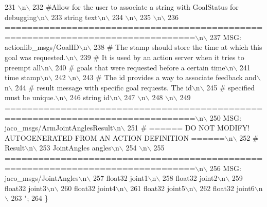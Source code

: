 \begin{DoxyCode}
231 \textcolor{stringliteral}{\(\backslash\)n\(\backslash\)}
232 \textcolor{stringliteral}{#Allow for the user to associate a string with GoalStatus for debugging\(\backslash\)n\(\backslash\)}
233 \textcolor{stringliteral}{string text\(\backslash\)n\(\backslash\)}
234 \textcolor{stringliteral}{\(\backslash\)n\(\backslash\)}
235 \textcolor{stringliteral}{\(\backslash\)n\(\backslash\)}
236 \textcolor{stringliteral}{================================================================================\(\backslash\)n\(\backslash\)}
237 \textcolor{stringliteral}{MSG: actionlib\_msgs/GoalID\(\backslash\)n\(\backslash\)}
238 \textcolor{stringliteral}{# The stamp should store the time at which this goal was requested.\(\backslash\)n\(\backslash\)}
239 \textcolor{stringliteral}{# It is used by an action server when it tries to preempt all\(\backslash\)n\(\backslash\)}
240 \textcolor{stringliteral}{# goals that were requested before a certain time\(\backslash\)n\(\backslash\)}
241 \textcolor{stringliteral}{time stamp\(\backslash\)n\(\backslash\)}
242 \textcolor{stringliteral}{\(\backslash\)n\(\backslash\)}
243 \textcolor{stringliteral}{# The id provides a way to associate feedback and\(\backslash\)n\(\backslash\)}
244 \textcolor{stringliteral}{# result message with specific goal requests. The id\(\backslash\)n\(\backslash\)}
245 \textcolor{stringliteral}{# specified must be unique.\(\backslash\)n\(\backslash\)}
246 \textcolor{stringliteral}{string id\(\backslash\)n\(\backslash\)}
247 \textcolor{stringliteral}{\(\backslash\)n\(\backslash\)}
248 \textcolor{stringliteral}{\(\backslash\)n\(\backslash\)}
249 \textcolor{stringliteral}{================================================================================\(\backslash\)n\(\backslash\)}
250 \textcolor{stringliteral}{MSG: jaco\_msgs/ArmJointAnglesResult\(\backslash\)n\(\backslash\)}
251 \textcolor{stringliteral}{# ====== DO NOT MODIFY! AUTOGENERATED FROM AN ACTION DEFINITION ======\(\backslash\)n\(\backslash\)}
252 \textcolor{stringliteral}{# Result\(\backslash\)n\(\backslash\)}
253 \textcolor{stringliteral}{JointAngles angles\(\backslash\)n\(\backslash\)}
254 \textcolor{stringliteral}{\(\backslash\)n\(\backslash\)}
255 \textcolor{stringliteral}{================================================================================\(\backslash\)n\(\backslash\)}
256 \textcolor{stringliteral}{MSG: jaco\_msgs/JointAngles\(\backslash\)n\(\backslash\)}
257 \textcolor{stringliteral}{float32 joint1\(\backslash\)n\(\backslash\)}
258 \textcolor{stringliteral}{float32 joint2\(\backslash\)n\(\backslash\)}
259 \textcolor{stringliteral}{float32 joint3\(\backslash\)n\(\backslash\)}
260 \textcolor{stringliteral}{float32 joint4\(\backslash\)n\(\backslash\)}
261 \textcolor{stringliteral}{float32 joint5\(\backslash\)n\(\backslash\)}
262 \textcolor{stringliteral}{float32 joint6\(\backslash\)n\(\backslash\)}
263 \textcolor{stringliteral}{"};
264   \}
\end{DoxyCode}
